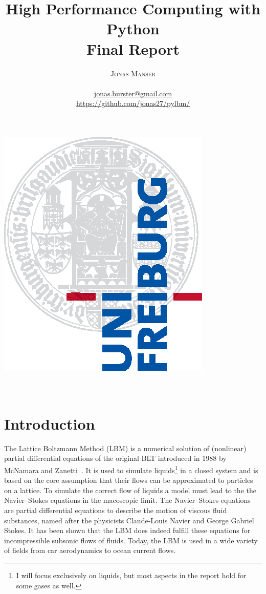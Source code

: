 \documentclass[a4paper,12pt, oneside]{book}
\title{\Huge \textbf{High Performance Computing with Python} \vspace{4mm} \\ \huge Final Report}
\author{\textsc{Jonas Manser} \\ 
\vspace{3mm}\text{4953222}  \\
\vspace{3mm}\url{jonas.burster@gmail.com} \\
\vspace{3mm}\url{https://github.com/jonas27/pylbm/}}
\begin{document}
\makeatletter
\begin{titlepage}
  \begin{center}
    \includegraphics[width=0.5\linewidth]{logos/Uni_Logo-Grundversion_E1_A4_CMYK.eps}\\[4ex]
    {\huge \bfseries  \@title }\\[2ex]
    {\LARGE  \@author}\\[30ex]
    {\large \@date}
  \end{center}
\end{titlepage}
\makeatother
\thispagestyle{empty}

\tableofcontents
\thispagestyle{plain}
\listoffigures
\thispagestyle{plain}
\lstlistoflistings
\thispagestyle{plain}






\pagestyle{fancy}
\renewcommand{\chaptermark}[1]{%
  \markboth{\thechapter.\ #1}{}}
\renewcommand{\sectionmark}[1]{%
  \markright{\thesection.\ #1}}


\chapter{Introduction}
The Lattice Boltzmann Method (LBM) is a numerical solution of (nonlinear) partial differential equations of the original BLT introduced in 1988 by McNamara and Zanetti~\cite{mcnamara1988boltzmann-method}.
It is used to simulate liquids\footnote{I will focus exclusively on liquids, but most aspects in the report hold for some gases as well.} in a closed system and is based on the core assumption that their flows can be approximated to particles on a lattice.
To simulate the correct flow of liquids a model must lead to the the Navier–Stokes equations in the macoscopic limit.
The Navier–Stokes equations are partial differential equations to describe the motion of viscous fluid substances, named after the physicists Claude-Louis Navier and George Gabriel Stokes.
It has been shown that the LBM does indeed fulfill these equations for incompressible subsonic flows of fluids.
Today, the LBM is used in a wide variety of fields from car aerodynamics to ocean current flows.
\end{document}
